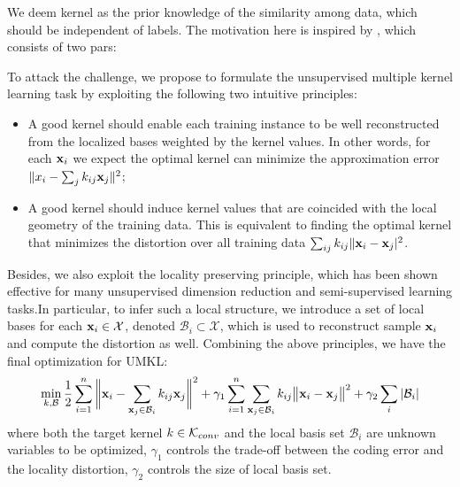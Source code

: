  We deem kernel as the prior knowledge of the similarity among data, which should be independent of labels. The motivation here is inspired by \cite{nips/YuZG09}, which consists of two pars:\fi

To attack the challenge, we propose to formulate the unsupervised multiple kernel learning task by exploiting the following two intuitive principles:
\begin{itemize}
\item A good kernel should enable each training instance to be well reconstructed from the localized bases weighted by the kernel values. In other words, for each $\mathbf{x}_i$ we expect the optimal kernel can minimize the approximation error $\|x_i-\sum_jk_{ij}\mathbf{x}_j\|^2$;
\item A good kernel should induce kernel values that are coincided with the local geometry of the training data. This is equivalent to finding the optimal kernel that minimizes the distortion over all training data $\sum_{ij}k_{ij}\|\mathbf{x}_i-\mathbf{x}_j|^2$.
\end{itemize}

Besides, we also exploit the locality preserving principle, which has been shown effective for many unsupervised dimension reduction and semi-supervised learning tasks.In particular, to infer such a local structure, we introduce a set of local bases for each $\mathbf{x}_i\in\mathcal X$, denoted $\mathcal B_i\subset\mathcal X$, which is used to reconstruct sample $\mathbf{x}_i$ and compute the distortion as well. Combining the above principles, we have the final optimization for UMKL:
\begin{eqnarray}
\min_{k, \mathcal B} \frac{1}{2}\sum_{i=1}^n \bigg\| \mathbf{x}_i - \sum_{\mathbf{x}_j\in\mathcal B_i} k_{ij}\mathbf{x}_j \bigg\|^2 + \gamma_1\sum_{i=1}^n\sum_{\mathbf{x}_j\in\mathcal B_i} k_{ij}\big\| \mathbf{x}_i - \mathbf{x}_j \big\|^2 + \gamma_2\sum_i| \mathcal B_i |
\end{eqnarray}
where both the target kernel $k\in {\mathcal K}_{conv}$ and the local basis set $\mathcal B_i$ are unknown variables to be optimized, $\gamma_1$ controls the trade-off between the coding error and the locality distortion, $\gamma_2$ controls the size of local basis set.

